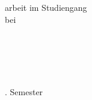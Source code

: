 
\begin{titlepage}
	\begin{center}
	
		\setmainfont{Calibri}
		\vspace{2.5cm}
    		
    	\textbf{\Huge \conftitle}\\
    	\vspace{0.5cm}
		\textbf{\Huge \conftitletwo}\\
      	
    	\vspace{2.25cm}
		
       	\textbf{\LARGE \confaut}\\
       	\vspace{0.4cm}
       	{\Large \confmatnr}\\ 
       	\vspace{2.25cm}
            
       	{\large\confstudab arbeit im Studiengang \confstud\\
       	\vspace{0.4cm}
       	bei\\
       	\vspace{0.4cm}
       	\confprof\\}       
            
       	\vfill
       
       	\begin{minipage}{0.48\textwidth}
       	\begin{flushleft}
       		{\large\confadrstr\\
       		\confadrort}
       	\end{flushleft}
		\end{minipage}       			       	
		\hfill
       	\begin{minipage}{0.48\textwidth}
       	\begin{flushright}
       		{\large\confstudf\\
       		\confstudftwo}
       	\end{flushright}
		\end{minipage}
		       			       			       	
       	\vspace{1cm}

       	{\large\confdate		\hfill	\confsem. Semester}
   	\end{center}
\end{titlepage}

\setmainfont{Arial}